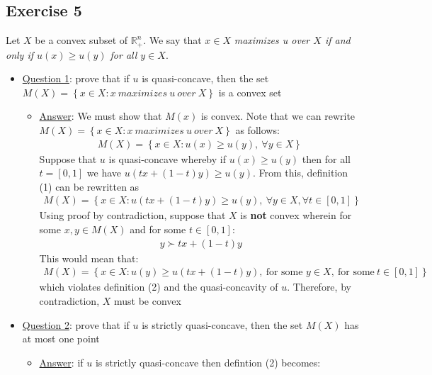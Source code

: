 \documentclass{article}
\begin{document}
\subsection{Exercise 5}
Let $X$ be a convex subset of $\mathbb{R}_{+}^{n}$. We say that $x \in X$ \textit{maximizes u over $X$ if and only if $u(x) \geq u(y)$ for all $y \in X$}. \par \vspace{0.3em}
\begin{itemize}
  \item  \underline{Question 1}: prove that if $u$ is quasi-concave, then the set $M(X) = \left\{ x \in X: x \ \textit{maximizes} \ u \ \textit{over} \ X \right\}$ is a convex set
  \begin{itemize}
    \item  \underline{Answer}: We must show that $M(x)$ is convex. Note that we can rewrite $M(X) = \left\{ x \in X: x \ \textit{maximizes} \ u \ \textit{over} \ X \right\}$ as follows:
    \begin{gather*}
      M(X) = \left\{x \in X: u(x) \geq u(y), \ \forall y \in X \right\} \ \tag{1}
    \end{gather*}
    Suppose that $u$ is quasi-concave whereby if $u(x) \geq u(y)$ then for all $t = [0,1]$ we have $u(tx + (1-t)y) \geq u(y)$. From this, definition (1) can be rewritten as
    \begin{gather*}
      M(X) = \left\{x \in X: u(tx + (1-t)y) \geq u(y), \ \forall y \in X, \forall t \in [0,1] \right\} \ \tag{2}
    \end{gather*}
    Using proof by contradiction, suppose that $X$ is \textbf{not} convex wherein for some $x,y \in M(X)$ and for some $t \in [0,1]$:
    \begin{gather*}
      y \succ tx + (1-t) y
    \end{gather*}
    This would mean that:
    \begin{gather*}
      M(X) = \left\{x \in X: u(y) \geq u(tx + (1-t)y), \ \text{for some } y \in X, \ \text{for some} \ t \in [0,1] \right\}
    \end{gather*}
    which violates definition (2) and the quasi-concavity of $u$. Therefore, by contradiction, $X$ must be convex
  \end{itemize}
  \item  \underline{Question 2}: prove that if $u$ is strictly quasi-concave, then the set $M(X)$ has at most one point
  \begin{itemize}
    \item  \underline{Answer}: if $u$ is strictly quasi-concave then defintion (2) becomes:

\end{itemize}
\end{itemize}
\end{document}
